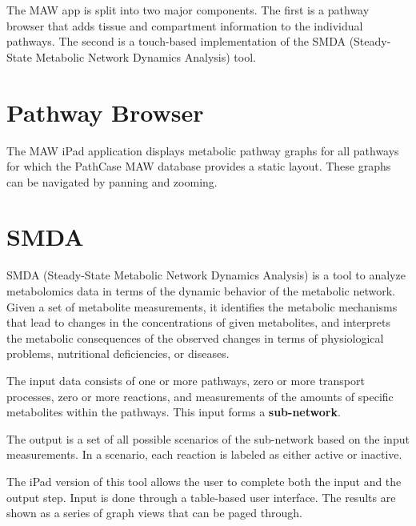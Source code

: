 The MAW app is split into two major components. The first is a pathway browser
that adds tissue and compartment information to the individual pathways. The
second is a touch-based implementation of the SMDA (Steady-State Metabolic
Network Dynamics Analysis) tool.

\section{Pathway Browser}

The MAW iPad application displays metabolic pathway graphs for all pathways for
which the PathCase MAW database provides a static layout. These graphs can be
navigated by panning and zooming.





\section{SMDA}
\label{sect:smda}

SMDA (Steady-State Metabolic Network Dynamics Analysis) is a tool to analyze
metabolomics data in terms of the dynamic behavior of the metabolic network.
Given a set of metabolite measurements, it identifies the metabolic mechanisms
that lead to changes in the concentrations of given metabolites, and interprets
the metabolic consequences of the observed changes in terms of physiological
problems, nutritional deficiencies, or diseases.

The input data consists of one or more pathways, zero or more transport
processes, zero or more reactions, and measurements of the amounts of specific
metabolites within the pathways. This input forms a \textbf{sub-network}.

The output is a set of all possible scenarios of the sub-network based on the
input measurements. In a scenario, each reaction is labeled as either active or
inactive.

The iPad version of this tool allows the user to complete both the input and
the output step. Input is done through a table-based user interface. The results
are shown as a series of graph views that can be paged through.







